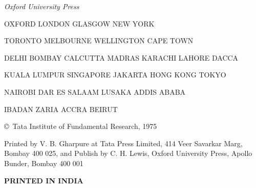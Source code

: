 \begin{center}
{\em Oxford University Press}
\medskip

OXFORD LONDON GLASGOW NEW YORK

TORONTO MELBOURNE WELLINGTON CAPE TOWN

DELHI BOMBAY CALCUTTA MADRAS KARACHI LAHORE DACCA

KUALA LUMPUR SINGAPORE JAKARTA HONG KONG TOKYO

NAIROBI DAR ES SALAAM LUSAKA ADDIS ABABA

IBADAN ZARIA ACCRA BEIRUT

\bigskip

\vskip 1cm

\copyright\ Tata Institute of Fundamental Research, 1975

\vfill

Printed by V. B. Gharpure at Tata Press Limited, 414 Veer Savarkar Marg, Bombay 400 025, and Publish by C. H. Lewis, Oxford University Press, Apollo Bunder, Bombay 400 001 

\medskip
\textbf{PRINTED IN INDIA}
\end{center}

\eject
